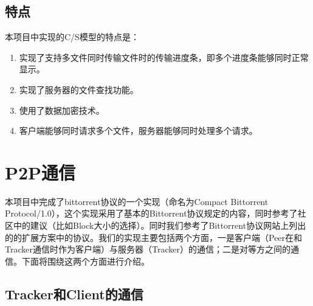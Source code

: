 \documentclass[15pt]{ctexart}
\begin{document}
\subsection{特点} %
\label{sub:特点}
本项目中实现的C/S模型的特点是：
\begin{enumerate}
	\item 实现了支持多文件同时传输文件时的传输进度条，即多个进度条能够同时正常显示。
	\item 实现了服务器的文件查找功能。
	\item 使用了数据加密技术。
	\item 客户端能够同时请求多个文件，服务器能够同时处理多个请求。
\end{enumerate}


\section{P2P通信} %
\label{sec:p2p通信}
	本项目中完成了bittorrent协议的一个实现（命名为Compact Bittorrent Protocol/1.0），这个实现采用了基本的Bittorrent协议规定的内容，同时参考了社区中的建议（比如Block大小的选择）。同时我们参考了Bittorrent协议网站上列出的的扩展方案中的协议。我们的实现主要包括两个方面，一是客户端（Peer在和Tracker通信时作为客户端）与服务器（Tracker）的通信；二是对等方之间的通信。下面将围绕这两个方面进行介绍。
	\subsection{Tracker和Client的通信} %
	\label{sub:tracker_和_client}
\end{document}
